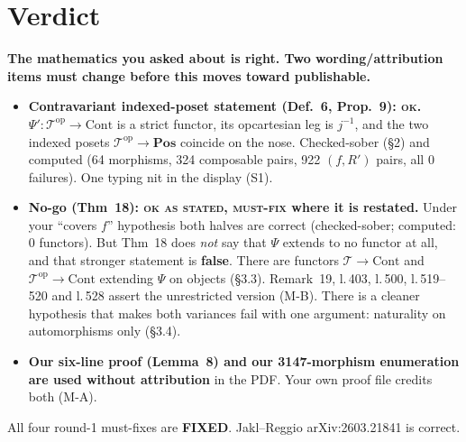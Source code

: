 \documentclass[11pt]{article}
\newcommand{\iss}[1]{\textsc{#1}}
\newcommand{\Cont}{\mathrm{Cont}}
\newcommand{\Pos}{\mathbf{Pos}}
\newcommand{\T}{\mathcal T}
\begin{document}
\section*{Verdict}
\textbf{The mathematics you asked about is right. Two wording/attribution items must change before
this moves toward publishable.}
\begin{itemize}[leftmargin=*]
\item \textbf{Contravariant indexed-poset statement (Def.~6, Prop.~9): \iss{ok}.} $\Psi'\colon\T^{\mathrm{op}}
\to\Cont$ is a strict functor, its opcartesian leg is $j^{-1}$, and the two indexed posets
$\T^{\mathrm{op}}\to\Pos$ coincide on the nose. Checked-sober (\S2) and computed (64 morphisms, 324
composable pairs, 922 $(f,R')$ pairs, all 0 failures). One typing nit in the display (S1).
\item \textbf{No-go (Thm~18): \iss{ok as stated}, \iss{must-fix} where it is restated.} Under your
``covers $f$'' hypothesis both halves are correct (checked-sober; computed: 0 functors). But
Thm~18 does \emph{not} say that $\Psi$ extends to no functor at all, and that stronger statement is
\textbf{false}. There are functors $\T\to\Cont$ and $\T^{\mathrm{op}}\to\Cont$ extending $\Psi$ on
objects (\S3.3). Remark~19, l.\,403, l.\,500, l.\,519--520 and l.\,528 assert the unrestricted
version (M-B). There is a cleaner hypothesis that makes both variances fail with one argument:
naturality on automorphisms only (\S3.4).
\item \textbf{Our six-line proof (Lemma~8) and our 3147-morphism enumeration are used without
attribution} in the PDF. Your own proof file credits both (M-A).
\end{itemize}
All four round-1 must-fixes are \textbf{FIXED}. Jakl--Reggio arXiv:2603.21841 is correct.
\end{document}
